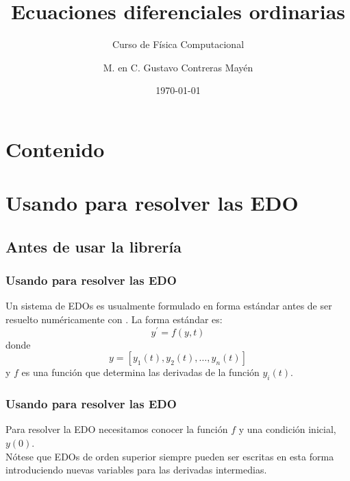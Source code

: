 



\normalfont
\usepackage{ccfonts}%
\usepackage[T1]{fontenc}%
\renewcommand{\rmdefault}{cmr}%
\linespread{1.3}
\title{Ecuaciones diferenciales ordinarias}
\subtitle{Curso de Física Computacional}
\author{M. en C. Gustavo Contreras Mayén}
\date{\today}

\maketitle
\fontsize{14}{14}\selectfont
{}
\section*{Contenido}
\section{Usando \python{} para resolver las EDO}
\subsection{Antes de usar la librería}
\begin{frame}
\frametitle{Usando \python{} para resolver las EDO}
Un sistema de EDOs es usualmente formulado en forma estándar antes de ser resuelto numéricamente con \python. La forma estándar es:
\[ y^{\prime} = f(y,t)\]
donde
\[ y=[y_{1}(t), y_{2}(t), \ldots,y _{n}(t)]\]
y $f$ es una función que determina las derivadas de la función $y_{i}(t)$.
\end{frame}
\begin{frame}
\frametitle{Usando \python{} para resolver las EDO}
Para resolver la EDO necesitamos conocer la función $f$ y una condición inicial, $y(0)$.
\\
\medskip
Nótese que EDOs de orden superior siempre pueden ser escritas en esta forma introduciendo nuevas variables para las derivadas intermedias.
\end{frame}
